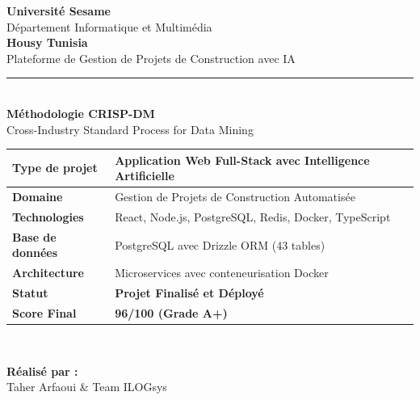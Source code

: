 \documentclass[12pt, a4paper]{report}
\newcommand{\etablissement}{Université Sesame}
\newcommand{\projetnom}{Housy Tunisia}
\newcommand{\projetsubtitle}{Plateforme de Gestion de Projets de Construction avec IA}
\newcommand{\auteur}{Taher Arfaoui \& Team ILOGsys}
\begin{document}
\begin{titlepage}
\centering
\vspace*{1cm}
{\Large \textbf{\etablissement}}\\[0.5cm]
{\large Département Informatique et Multimédia}\\[2cm]

{\Huge \textcolor{housyblue}{\textbf{\projetnom}}}\\[0.4cm]
{\Large \textcolor{housygray}{\projetsubtitle}}\\[1.5cm]

\noindent\rule{\textwidth}{1pt}\\[0.7cm]

{\large \textbf{Méthodologie CRISP-DM}}\\
{\small Cross-Industry Standard Process for Data Mining}\\[1.5cm]

\begin{tabularx}{0.9\textwidth}{|l|X|}
    \hline
    \textbf{Type de projet} & Application Web Full-Stack avec Intelligence Artificielle \\
    \hline
    \textbf{Domaine} & Gestion de Projets de Construction Automatisée \\
    \hline
    \textbf{Technologies} & React, Node.js, PostgreSQL, Redis, Docker, TypeScript \\
    \hline
    \textbf{Base de données} & PostgreSQL avec Drizzle ORM (43 tables) \\
    \hline
    \textbf{Architecture} & Microservices avec conteneurisation Docker \\
    \hline
    \textbf{Statut} & \textcolor{housygreen}{\textbf{Projet Finalisé et Déployé}} \\
    \hline
    \textbf{Score Final} & \textcolor{housygreen}{\textbf{96/100 (Grade A+)}} \\
    \hline
\end{tabularx}\\[1.5cm]

\begin{minipage}[t]{0.45\textwidth}
    \raggedright
    \textbf{Réalisé par :}\\
    \auteur\\[0.8cm]
    

\end{minipage}
\end{titlepage}
\end{document}
